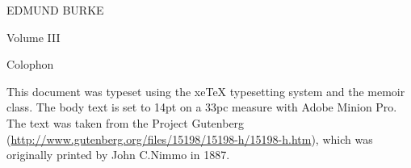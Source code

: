 \documentclass[a4paper,14pt,extrafontsizes]{memoir}
\begin{document}
\frontmatter


\pagestyle{empty}
\begin{center}
  \LARGE{EDMUND BURKE} \par \vspace{1.2in} 
   \par \vspace{0.2in}
   \par \vspace{0.2in}
   \par \vspace{1.5in}
  \LARGE{Volume III}  \par \vspace{0.2in}
\end{center}

\cleardoublepage
{}
\pagestyle{headings}
\tableofcontents*   %


\mainmatter
{}
\pagestyle{ocd}




\backmatter
\cleardoublepage
\pagestyle{empty}
\null\vfil

\begin{adjustwidth}{1in}{1in}
\begin{center}
{\Large\textsf{Colophon}}
\end{center}
\begin{center}
  This document was typeset using the xeTeX typesetting system
  and the memoir class. The body text is set to 14pt on a
  33pc measure with Adobe Minion Pro. The text was taken from the
  Project Gutenberg
  (\url{http://www.gutenberg.org/files/15198/15198-h/15198-h.htm}),
  which was originally printed by John C.Nimmo in 1887.
\end{center}
\end{adjustwidth}
 {}  %

\vfil
\end{document}
